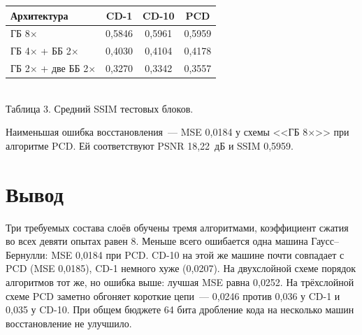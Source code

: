 \documentclass[12pt,a4paper]{article}
\begin{document}
\begin{center}
\begin{tabular}{lccc}
\toprule
Архитектура & CD-1 & CD-10 & PCD \\
\midrule
ГБ 8$\times$ & 0{,}5846 & 0{,}5961 & 0{,}5959 \\
ГБ 4$\times$ + ББ 2$\times$ & 0{,}4030 & 0{,}4104 & 0{,}4178 \\
ГБ 2$\times$ + две ББ 2$\times$ & 0{,}3270 & 0{,}3342 & 0{,}3557 \\
\bottomrule
\end{tabular}\\[0.4em]
{\small Таблица 3. Средний SSIM тестовых блоков.}
\end{center}

Наименьшая ошибка восстановления~--- MSE 0{,}0184 у схемы <<ГБ 8$\times$>> при алгоритме PCD. Ей соответствуют PSNR 18{,}22~дБ и SSIM 0{,}5959.

\section{Вывод}

Три требуемых состава слоёв обучены тремя алгоритмами, коэффициент сжатия во всех девяти опытах равен 8. Меньше всего ошибается одна машина Гаусс--Бернулли: MSE 0{,}0184 при PCD. CD-10 на этой же машине почти совпадает с PCD (MSE 0{,}0185), CD-1 немного хуже (0{,}0207). На двухслойной схеме порядок алгоритмов тот же, но ошибка выше: лучшая MSE равна 0{,}0252. На трёхслойной схеме PCD заметно обгоняет короткие цепи~--- 0{,}0246 против 0{,}036 у CD-1 и 0{,}035 у CD-10. При общем бюджете 64 бита дробление кода на несколько машин восстановление не улучшило.
\end{document}
